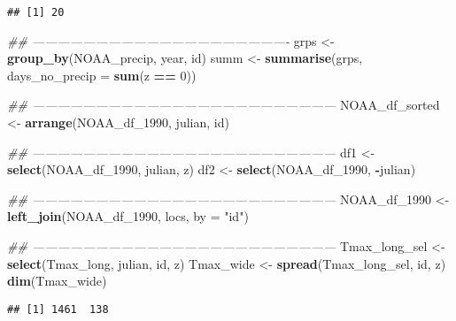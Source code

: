 \documentclass[]{book}
\newenvironment{Shaded}{\begin{snugshade}}{\end{snugshade}}
\newcommand{\CommentTok}[1]{\textcolor[rgb]{0.56,0.35,0.01}{\textit{#1}}}
\newcommand{\DataTypeTok}[1]{\textcolor[rgb]{0.13,0.29,0.53}{#1}}
\newcommand{\DecValTok}[1]{\textcolor[rgb]{0.00,0.00,0.81}{#1}}
\newcommand{\KeywordTok}[1]{\textcolor[rgb]{0.13,0.29,0.53}{\textbf{#1}}}
\newcommand{\NormalTok}[1]{#1}
\newcommand{\OperatorTok}[1]{\textcolor[rgb]{0.81,0.36,0.00}{\textbf{#1}}}
\newcommand{\StringTok}[1]{\textcolor[rgb]{0.31,0.60,0.02}{#1}}
\begin{document}
\begin{verbatim}
## [1] 20
\end{verbatim}

\begin{Shaded}
\begin{Highlighting}[]
\CommentTok{## -------------------------------------------------------------}
\NormalTok{grps <-}\StringTok{ }\KeywordTok{group_by}\NormalTok{(NOAA_precip, year, id)}
\NormalTok{summ <-}\StringTok{ }\KeywordTok{summarise}\NormalTok{(grps, }\DataTypeTok{days_no_precip =} \KeywordTok{sum}\NormalTok{(z }\OperatorTok{==}\StringTok{ }\DecValTok{0}\NormalTok{))}

\CommentTok{## ------------------------------------------------------------------------}
\NormalTok{NOAA_df_sorted <-}\StringTok{ }\KeywordTok{arrange}\NormalTok{(NOAA_df_}\DecValTok{1990}\NormalTok{, julian, id)}

\CommentTok{## ------------------------------------------------------------------------}
\NormalTok{df1 <-}\StringTok{ }\KeywordTok{select}\NormalTok{(NOAA_df_}\DecValTok{1990}\NormalTok{, julian, z)}
\NormalTok{df2 <-}\StringTok{ }\KeywordTok{select}\NormalTok{(NOAA_df_}\DecValTok{1990}\NormalTok{, }\OperatorTok{-}\NormalTok{julian)}

\CommentTok{## ------------------------------------------------------------------------}
\NormalTok{NOAA_df_}\DecValTok{1990}\NormalTok{ <-}\StringTok{ }\KeywordTok{left_join}\NormalTok{(NOAA_df_}\DecValTok{1990}\NormalTok{, locs, }\DataTypeTok{by =} \StringTok{"id"}\NormalTok{)}

\CommentTok{## ------------------------------------------------------------------------}
\NormalTok{Tmax_long_sel <-}\StringTok{ }\KeywordTok{select}\NormalTok{(Tmax_long, julian, id, z)}
\NormalTok{Tmax_wide <-}\StringTok{ }\KeywordTok{spread}\NormalTok{(Tmax_long_sel, id, z)}
\KeywordTok{dim}\NormalTok{(Tmax_wide)}
\end{Highlighting}
\end{Shaded}

\begin{verbatim}
## [1] 1461  138
\end{verbatim}
\end{document}
